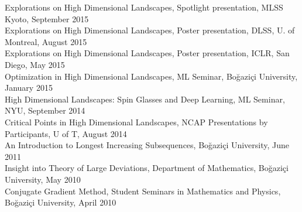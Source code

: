 \documentclass[10pt,letterpaper]{article}
\renewenvironment{itemize}
{
\begin{list}{}{\setlength{\leftmargin}{1.5em}}
}
{
  \end{list}
}
\begin{document}
\begin{itemize}
Explorations on High Dimensional Landscapes, Spotlight presentation, MLSS Kyoto, September 2015 \\ 
Explorations on High Dimensional Landscapes, Poster presentation, DLSS, U. of Montreal, August 2015 \\ 
Explorations on High Dimensional Landscapes, Poster presentation, ICLR, San Diego, May 2015 \\ 
Optimization in High Dimensional Landscapes, ML Seminar, Bo\u{g}azi\c{c}i University, January 2015 \\ 
High Dimensional Landscapes: Spin Glasses and Deep Learning, ML Seminar, NYU, September 2014 \\ 
Critical Points in High Dimensional Landscapes, NCAP Presentations by Participants, U of T, August 2014 \\ 
An Introduction to Longest Increasing Subsequences, Bo\u{g}azi\c{c}i University, June 2011 \\ 
Insight into Theory of Large Deviations, Department of Mathematics, Bo\u{g}azi\c{c}i University, May 2010 \\ 
Conjugate Gradient Method, Student Seminars in Mathematics and Physics, Bo\u{g}azi\c{c}i University, April 2010
\end{itemize}
\end{document}

